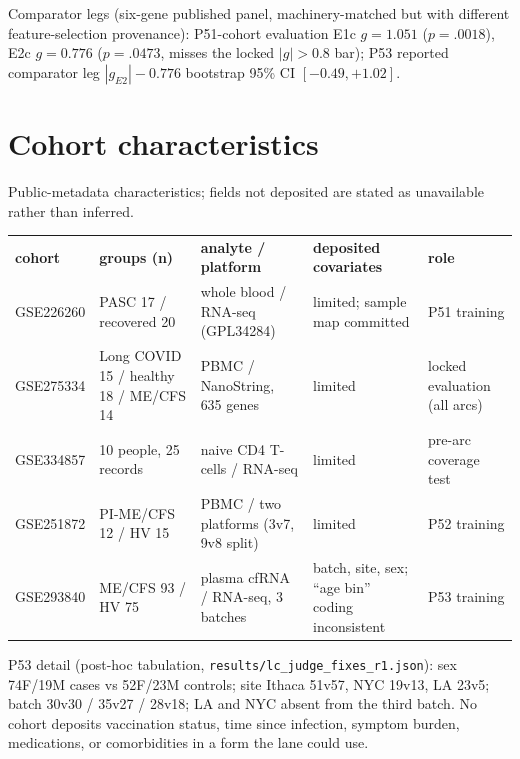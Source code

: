 \documentclass[11pt,a4paper]{article}
\begin{document}
Comparator legs (six-gene published panel, machinery-matched but with
different feature-selection provenance): P51-cohort evaluation
E1c $g=1.051$ ($p=.0018$), E2c $g=0.776$ ($p=.0473$, misses the locked
$|g|>0.8$ bar); P53 reported comparator leg $|g_{E2}|-0.776$ bootstrap
95\% CI $[-0.49, +1.02]$.

\section{Cohort characteristics}
\label{sec:cohorts}
Public-metadata characteristics; fields not deposited are stated as
unavailable rather than inferred.

\begin{longtable}{lllll}
\textbf{cohort} & \textbf{groups (n)} & \textbf{analyte / platform} & \textbf{deposited covariates} & \textbf{role}\\
GSE226260 & PASC 17 / recovered 20 & whole blood / RNA-seq (GPL34284) & limited; sample map committed & P51 training\\
GSE275334 & Long COVID 15 / healthy 18 / ME/CFS 14 & PBMC / NanoString, 635 genes & limited & locked evaluation (all arcs)\\
GSE334857 & 10 people, 25 records & naive CD4 T-cells / RNA-seq & limited & pre-arc coverage test\\
GSE251872 & PI-ME/CFS 12 / HV 15 & PBMC / two platforms (3v7, 9v8 split) & limited & P52 training\\
GSE293840 & ME/CFS 93 / HV 75 & plasma cfRNA / RNA-seq, 3 batches & batch, site, sex; ``age bin'' coding inconsistent & P53 training\\
\end{longtable}

P53 detail (post-hoc tabulation, \texttt{results/lc\_judge\_fixes\_r1.json}):
sex 74F/19M cases vs 52F/23M controls; site Ithaca 51v57, NYC 19v13, LA
23v5; batch 30v30 / 35v27 / 28v18; LA and NYC absent from the third batch.
No cohort deposits vaccination status, time since infection, symptom
burden, medications, or comorbidities in a form the lane could use.
\end{document}
